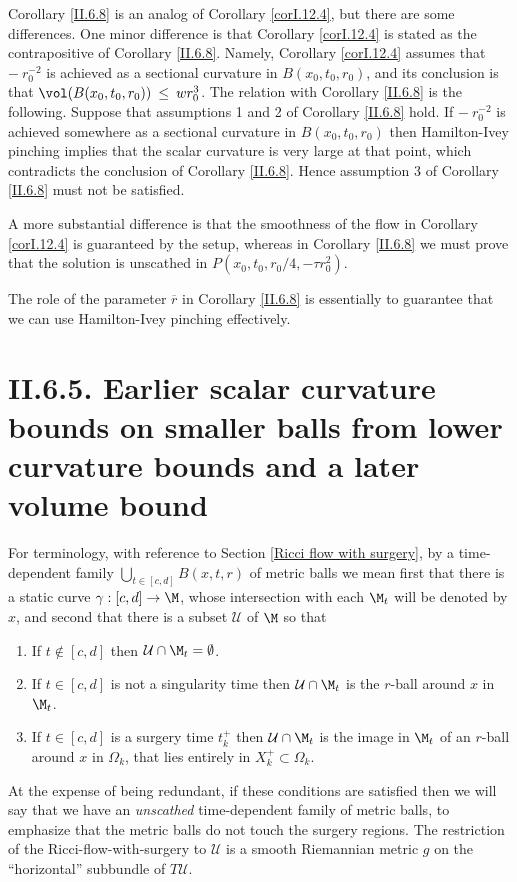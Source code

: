 Corollary \ref{II.6.8} is an analog of Corollary \ref{corI.12.4}, but there
are some differences.  One minor difference is that Corollary \ref{corI.12.4} is
stated as the contrapositive of Corollary \ref{II.6.8}. Namely,
Corollary \ref{corI.12.4} assumes that $- \: r_0^{-2}$ is achieved as a sectional
curvature in $B(x_0, t_0, r_0)$, and its conclusion is that
$\vol(B(x_0, t_0, r_0)) \: \le \: w r_0^3$. The relation
with Corollary \ref{II.6.8} is the following. Suppose that
assumptions 1 and 2 of Corollary \ref{II.6.8} hold. If
$- \: r_0^{-2}$ is achieved somewhere as a sectional
curvature in $B(x_0, t_0, r_0)$ then Hamilton-Ivey pinching implies
that the scalar curvature is very large at that point,
which contradicts the conclusion
of Corollary \ref{II.6.8}. Hence assumption 3 of Corollary \ref{II.6.8}
must not be satisfied.

A more substantial difference is that the smoothness of the flow
in Corollary \ref{corI.12.4}
is guaranteed by the setup, whereas in Corollary \ref{II.6.8} we must
prove that the solution is unscathed in $P(x_0, t_0, r_0/4, - \tau r_0^2)$.

The role of the parameter $\overline{r}$ in Corollary \ref{II.6.8} is
essentially to guarantee that we can use Hamilton-Ivey pinching
effectively.


\section{II.6.5. Earlier scalar curvature bounds on smaller balls from
lower curvature bounds and a later volume bound} \label{II.6.5}

For terminology, with reference to Section \ref{Ricci flow with surgery},
by a time-dependent family $\bigcup_{t \in [c,d]} B(x, t, r)$
of metric balls we mean first that there is a static
curve $\gamma : [c,d] \rightarrow \M$, whose intersection with each
$\M_t$ will be denoted by $x$, and second that there is
a subset ${\mathcal U}$ of $\M$ so that
\begin{enumerate}
\item If $t \notin [c,d]$ then ${\mathcal U} \cap \M_t = \emptyset$.
\item If $t \in [c,d]$ is not
a singularity time then ${\mathcal U} \cap \M_t$ is the $r$-ball around $x$ in
$\M_t$.
\item If $t \in [c,d]$ is a surgery time $t_k^+$ then
${\mathcal U} \cap \M_t$ is
the image in $\M_t$ of an $r$-ball around $x$ in
$\Omega_k$, that lies entirely in $X_k^+ \subset \Omega_k$.
\end{enumerate}
At the expense of being redundant, if these conditions are
satisfied then we will say that
we have an {\em unscathed} time-dependent family of metric balls,
to emphasize that the metric balls do not touch the surgery regions.
The restriction of the Ricci-flow-with-surgery to ${\mathcal U}$
is a smooth Riemannian metric $g$ on the ``horizontal'' subbundle
of $T{\mathcal U}$.

